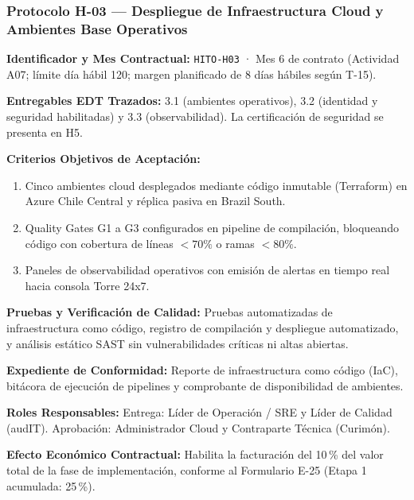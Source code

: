 \subsubsection*{Protocolo H-03 — Despliegue de Infraestructura Cloud y Ambientes Base Operativos}\label{sec:9-proto-h3}
\par\noindent\textbf{Identificador y Mes Contractual:} \texttt{HITO-H03} · Mes 6 de contrato (Actividad A07; límite día hábil 120; margen planificado de 8 días hábiles según T-15).\par
\par\noindent\textbf{Entregables EDT Trazados:} 3.1 (ambientes operativos), 3.2 (identidad y seguridad habilitadas) y 3.3 (observabilidad). La certificación de seguridad se presenta en H5.\par
\par\noindent\textbf{Criterios Objetivos de Aceptación:}
\begin{enumerate}
  \item Cinco ambientes cloud desplegados mediante código inmutable (Terraform) en Azure Chile Central y réplica pasiva en Brazil South.
  \item Quality Gates G1 a G3 configurados en pipeline de compilación, bloqueando código con cobertura de líneas $< 70\%$ o ramas $< 80\%$.
  \item Paneles de observabilidad operativos con emisión de alertas en tiempo real hacia consola Torre 24x7.
\end{enumerate}
\par\noindent\textbf{Pruebas y Verificación de Calidad:} Pruebas automatizadas de infraestructura como código, registro de compilación y despliegue automatizado, y análisis estático SAST sin vulnerabilidades críticas ni altas abiertas.\par
\par\noindent\textbf{Expediente de Conformidad:} Reporte de infraestructura como código (IaC), bitácora de ejecución de pipelines y comprobante de disponibilidad de ambientes.\par
\par\noindent\textbf{Roles Responsables:} Entrega: Líder de Operación / SRE y Líder de Calidad (audIT). Aprobación: Administrador Cloud y Contraparte Técnica (Curimón).\par
\par\noindent\textbf{Efecto Económico Contractual:} Habilita la facturación del 10\,\% del valor total de la fase de implementación, conforme al Formulario E-25 (Etapa 1 acumulada: 25\,\%).\par

